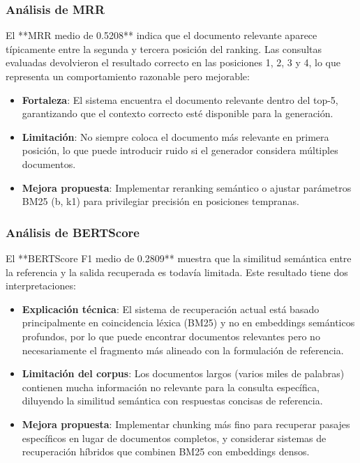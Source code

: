 \subsubsection{Análisis de MRR}

El **MRR medio de 0.5208** indica que el documento relevante aparece típicamente entre la segunda y tercera posición del ranking. Las consultas evaluadas devolvieron el resultado correcto en las posiciones 1, 2, 3 y 4, lo que representa un comportamiento razonable pero mejorable:

\begin{itemize}
    \item \textbf{Fortaleza}: El sistema encuentra el documento relevante dentro del top-5, garantizando que el contexto correcto esté disponible para la generación.
    \item \textbf{Limitación}: No siempre coloca el documento más relevante en primera posición, lo que puede introducir ruido si el generador considera múltiples documentos.
    \item \textbf{Mejora propuesta}: Implementar reranking semántico o ajustar parámetros BM25 (b, k1) para privilegiar precisión en posiciones tempranas.
\end{itemize}

\subsubsection{Análisis de BERTScore}

El **BERTScore F1 medio de 0.2809** muestra que la similitud semántica entre la referencia y la salida recuperada es todavía limitada. Este resultado tiene dos interpretaciones:

\begin{itemize}
    \item \textbf{Explicación técnica}: El sistema de recuperación actual está basado principalmente en coincidencia léxica (BM25) y no en embeddings semánticos profundos, por lo que puede encontrar documentos relevantes pero no necesariamente el fragmento más alineado con la formulación de referencia.
    \item \textbf{Limitación del corpus}: Los documentos largos (varios miles de palabras) contienen mucha información no relevante para la consulta específica, diluyendo la similitud semántica con respuestas concisas de referencia.
    \item \textbf{Mejora propuesta}: Implementar chunking más fino para recuperar pasajes específicos en lugar de documentos completos, y considerar sistemas de recuperación híbridos que combinen BM25 con embeddings densos.
\end{itemize}

